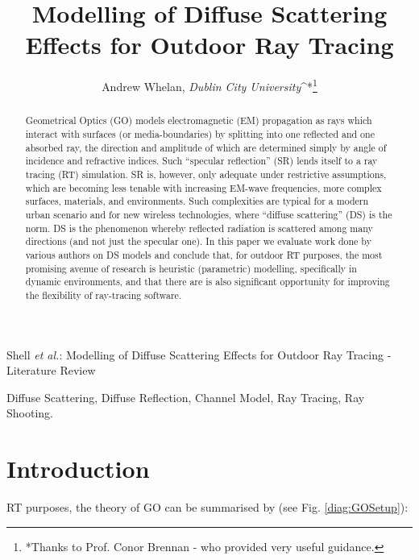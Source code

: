 \documentclass[lettersize,journal]{IEEEtran}
\begin{document}
\title{Modelling of Diffuse Scattering Effects for Outdoor Ray Tracing}
\author{Andrew Whelan, \emph{Dublin City University}^*\thanks{*Thanks to Prof. Conor Brennan - who provided very useful guidance.}}

%
{Shell \MakeLowercase{\textit{et al.}}: Modelling of Diffuse Scattering Effects for Outdoor Ray Tracing - Literature Review}

\maketitle

\begin{abstract}
Geometrical Optics (GO) models electromagnetic (EM) propagation as rays which interact with surfaces (or media-boundaries) by splitting into one reflected and one absorbed ray, the direction and amplitude of which are determined simply by angle of incidence and refractive indices. Such ``specular reflection'' (SR) lends itself to a ray tracing (RT) simulation. SR is, however, only adequate under restrictive assumptions, which are becoming less tenable with increasing EM-wave frequencies, more complex surfaces, materials, and environments. Such complexities are typical for a modern urban scenario and for new wireless technologies, where ``diffuse scattering'' (DS) is the norm. DS is the phenomenon whereby reflected radiation is scattered among many directions (and not just the specular one). In this paper we evaluate work done by various authors on  DS models and conclude that, for outdoor RT purposes, the most promising avenue of research is heuristic (parametric) modelling, specifically in dynamic environments, and that there are is also significant opportunity for improving the flexibility of ray-tracing software.
\end{abstract}

\begin{IEEEkeywords}
Diffuse Scattering, Diffuse Reflection, Channel Model, Ray Tracing, Ray Shooting.
\end{IEEEkeywords}

\section{Introduction}
 RT purposes, the theory of GO can be summarised by (see Fig. \ref{diag:GOSetup}):
\end{document}
